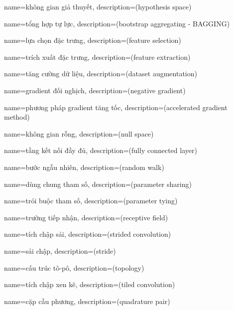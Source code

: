 {
    name={không gian giả thuyết},
    description={(hypothesis space)}
}

{
    name={tổng hợp tự lực},
    description={(bootstrap aggregating - BAGGING)}
}

{
    name={lựa chọn đặc trưng},
    description={(feature selection)}
}

{
    name={trích xuất đặc trưng},
    description={(feature extraction)}
}

{
    name={tăng cường dữ liệu},
    description={(dataset augmentation)}
}

{
    name={gradient đối nghịch},
    description={(negative gradient)}
}

{
    name={phương pháp gradient tăng tốc},
    description={(accelerated gradient method)}
}

{
    name={không gian rỗng},
    description={(null space)}
}

{
    name={tầng kết nối đầy đủ},
    description={(fully connected layer)}
}

{
    name={bước ngẫu nhiên},
    description={(random walk)}
}

{
    name={dùng chung tham số},
    description={(parameter sharing)}
}

{
    name={trói buộc tham số},
    description={(parameter tying)}
}

{
    name={trường tiếp nhận},
    description={(receptive field)}
}

{
    name={tích chập sải},
    description={(strided convolution)}
}

{
    name={sải chập},
    description={(stride)}
}

{
    name={cấu trúc tô-pô},
    description={(topology)}
}

{
    name={tích chập xen kẽ},
    description={(tiled convolution)}
}

{
    name={cặp cầu phương},
    description={(quadrature pair)}
}

